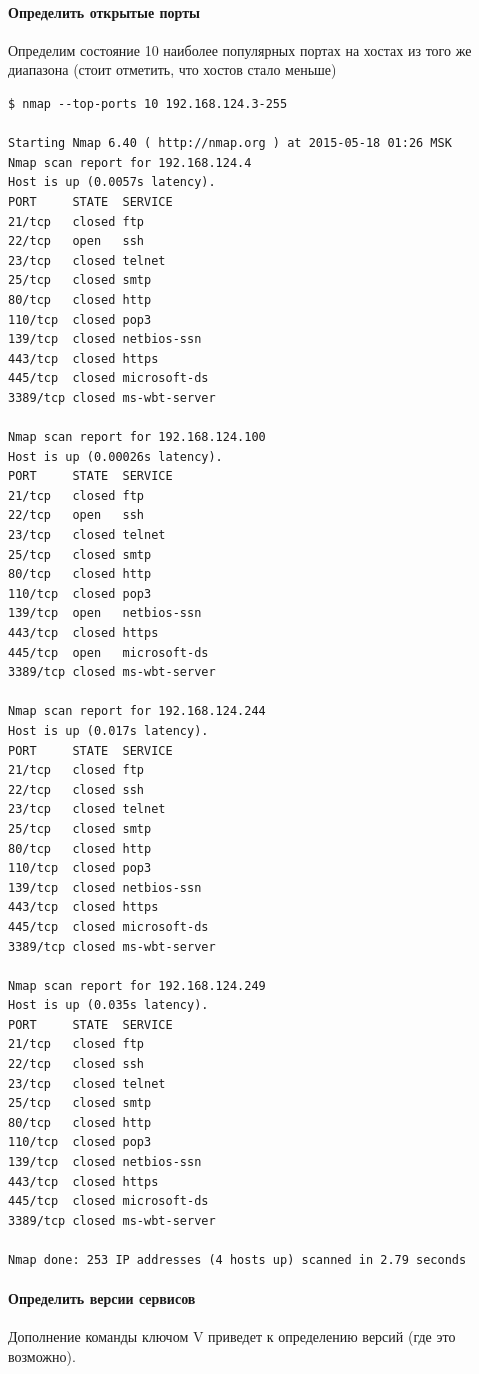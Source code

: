 \paragraph{Определить открытые порты}

Определим состояние 10 наиболее популярных портах на хостах из того же диапазона (стоит отметить, что хостов стало меньше)

\begin{Verbatim}[frame=single]
$ nmap --top-ports 10 192.168.124.3-255

Starting Nmap 6.40 ( http://nmap.org ) at 2015-05-18 01:26 MSK
Nmap scan report for 192.168.124.4
Host is up (0.0057s latency).
PORT     STATE  SERVICE
21/tcp   closed ftp
22/tcp   open   ssh
23/tcp   closed telnet
25/tcp   closed smtp
80/tcp   closed http
110/tcp  closed pop3
139/tcp  closed netbios-ssn
443/tcp  closed https
445/tcp  closed microsoft-ds
3389/tcp closed ms-wbt-server

Nmap scan report for 192.168.124.100
Host is up (0.00026s latency).
PORT     STATE  SERVICE
21/tcp   closed ftp
22/tcp   open   ssh
23/tcp   closed telnet
25/tcp   closed smtp
80/tcp   closed http
110/tcp  closed pop3
139/tcp  open   netbios-ssn
443/tcp  closed https
445/tcp  open   microsoft-ds
3389/tcp closed ms-wbt-server

Nmap scan report for 192.168.124.244
Host is up (0.017s latency).
PORT     STATE  SERVICE
21/tcp   closed ftp
22/tcp   closed ssh
23/tcp   closed telnet
25/tcp   closed smtp
80/tcp   closed http
110/tcp  closed pop3
139/tcp  closed netbios-ssn
443/tcp  closed https
445/tcp  closed microsoft-ds
3389/tcp closed ms-wbt-server

Nmap scan report for 192.168.124.249
Host is up (0.035s latency).
PORT     STATE  SERVICE
21/tcp   closed ftp
22/tcp   closed ssh
23/tcp   closed telnet
25/tcp   closed smtp
80/tcp   closed http
110/tcp  closed pop3
139/tcp  closed netbios-ssn
443/tcp  closed https
445/tcp  closed microsoft-ds
3389/tcp closed ms-wbt-server

Nmap done: 253 IP addresses (4 hosts up) scanned in 2.79 seconds
\end{Verbatim}

\paragraph{Определить версии сервисов} Дополнение команды ключом V приведет к определению версий (где это возможно).


